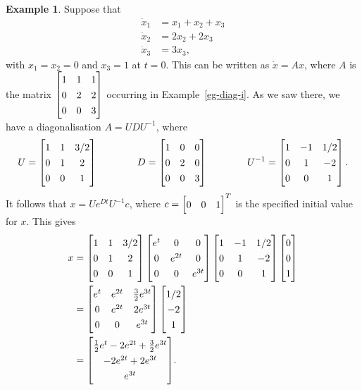 \documentclass[reqno]{amsart}
\theoremstyle{definition}
\newtheorem{example}[theorem]{Example}
\begin{document}
\begin{example}\label{eg-ode-i}
 Suppose that 
 \begin{align*}
  \dot{x}_1 &= x_1 + x_2 + x_3 \\
  \dot{x}_2 &= 2x_2 + 2x_3 \\
  \dot{x}_3 &= 3x_3,
 \end{align*}
 with $x_1=x_2=0$ and $x_3=1$ at $t=0$.  This can be written as
 $\dot{x}=Ax$, where $A$ is the matrix
 $\bbm 1&1&1 \\ 0&2&2 \\ 0&0&3\ebm$ occurring in
 Example~\ref{eg-diag-i}.  As we saw there, we have a diagonalisation
 $A=UDU^{-1}$, where 
 \[ U = 
    \bbm 1 & 1 & 3/2 \\ 0 & 1 & 2 \\ 0 & 0 & 1 \ebm
    \hspace{4em}
    D = \bbm 1 & 0 & 0 \\ 0 & 2 & 0 \\ 0 & 0 & 3 \ebm
    \hspace{4em}
    U^{-1} =
     \bbm
      1 & -1 & 1/2 \\ 0 & 1 & -2 \\ 0 & 0 & 1
     \ebm.
 \]
 It follows that $x=Ue^{Dt}U^{-1}c$, where $c=\bbm 0&0&1\ebm^T$ is the
 specified initial value for $x$.  This gives
 \begin{align*}
  x &= 
    \bbm 1 & 1 & 3/2 \\ 0 & 1 & 2 \\ 0 & 0 & 1 \ebm
    \bbm e^t & 0 & 0 \\ 0 & e^{2t} & 0 \\ 0 & 0 & e^{3t} \ebm 
    \bbm 1 & -1 & 1/2 \\ 0 & 1 & -2 \\ 0 & 0 & 1 \ebm
    \bbm 0 \\ 0 \\ 1 \ebm \\
    &= {\renewcommand{\arraystretch}{1.3}
    \bbm
     e^t & e^{2t} & \frac{3}{2}e^{3t} \\
     0 & e^{2t} & 2 e^{3t} \\
     0 & 0 & e^{3t} 
    \ebm }
    \bbm 1/2 \\ -2 \\ 1 \ebm \\
    &= {\renewcommand{\arraystretch}{1.3}
        \bbm \frac{1}{2}e^t -2e^{2t} + \frac{3}{2}e^{3t} \\
            -2e^{2t}+2e^{3t} \\
            e^{3t} \ebm}.    
 \end{align*}
\end{example}
\end{document}

